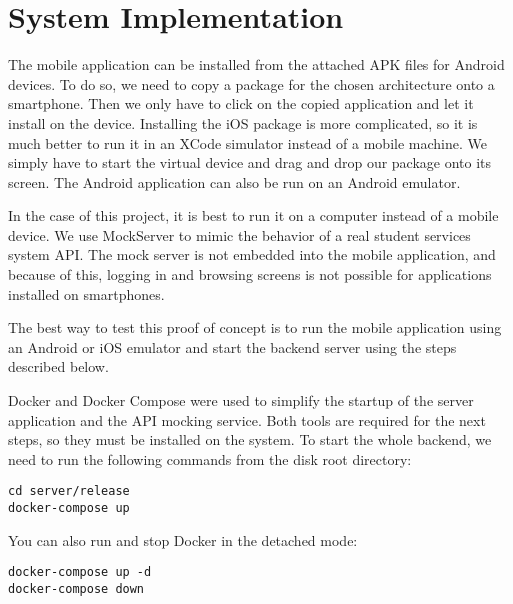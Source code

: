 \chapter{System Implementation}
The mobile application can be installed from the attached APK files for Android devices. To do so, we need to copy a package for the chosen architecture onto a smartphone. Then we only have to click on the copied application and let it install on the device. Installing the iOS package is more complicated, so it is much better to run it in an XCode simulator instead of a mobile machine. We simply have to start the virtual device and drag and drop our package onto its screen. The Android application can also be run on an Android emulator.

In the case of this project, it is best to run it on a computer instead of a mobile device. We use MockServer to mimic the behavior of a real student services system API. The mock server is not embedded into the mobile application, and because of this, logging in and browsing screens is not possible for applications installed on smartphones.

The best way to test this proof of concept is to run the mobile application using an Android or iOS emulator and start the backend server using the steps described below.

Docker and Docker Compose were used to simplify the startup of the server application and the API mocking service. Both tools are required for the next steps, so they must be installed on the system. To start the whole backend, we need to run the following commands from the disk root directory:
\begin{lstlisting}[numbers=none]
cd server/release
docker-compose up
\end{lstlisting}

\noindent You can also run and stop Docker in the detached mode:
\begin{lstlisting}[numbers=none]
docker-compose up -d
docker-compose down
\end{lstlisting}